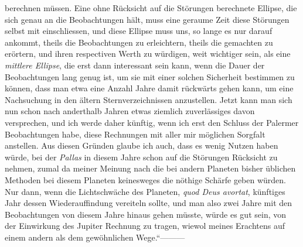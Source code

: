 berechnen müssen. Eine ohne Rücksicht auf die Störungen berechnete Ellipse, die sich genau an die Beobachtungen hält, muss eine geraume Zeit diese Störungen selbst mit einschliessen, und diese Ellipse muss uns, so lange es nur darauf ankommt, theils die Beobachtungen zu erleichtern, theils die gemachten zu erörtern, und ihren respectiven Werth zu würdigen, weit wichtiger sein, als eine \textit{mittlere Ellipse}, die erst dann interessant sein kann, wenn die Dauer der Beobachtungen lang genug ist, um sie mit einer solchen Sicherheit bestimmen zu können, dass man etwa eine Anzahl Jahre damit rückwärts gehen kann, um eine Nachsuchung in den ältern Sternverzeichnissen anzustellen. Jetzt kann man sich nun schon nach anderthalb Jahren etwas ziemlich zuverlässiges davon versprechen, und ich werde daher künftig, wenn ich erst den Schluss der Palermer
%
Beobachtungen habe, diese Rechnungen mit aller mir möglichen Sorgfalt anstellen. Aus diesen Gründen glaube ich auch, dass es wenig Nutzen haben würde, bei der \textit{Pallas} in diesem Jahre schon auf die Störungen Rücksicht zu nehmen, zumal da meiner Meinung nach die bei andern Planeten bisher üblichen Methoden bei diesem Planeten keinesweges die nöthige Schärfe geben würden. Nur dann, wenn die Lichtschwäche des Planeten, \textit{quod Deus avortat}, künftiges Jahr dessen Wiederauffindung vereiteln sollte, und man also zwei Jahre mit den Beobachtungen von diesem Jahre hinaus gehen müsste, würde es gut sein, von der Einwirkung des Jupiter Rechnung zu tragen, wiewol meines Erachtens auf einem andern als dem gewöhnlichen Wege.“\quad —\quad —\quad —

